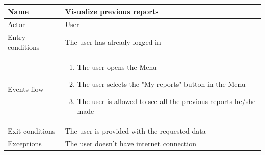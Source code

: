 \documentclass{article}
\begin{document}
\begin{table}[H]
    \begin{tabular}{|l|l|}
    \hline
    Name & \begin{minipage}[t]{0.7\textwidth} \textbf{Visualize previous reports}\end{minipage} \\ \hline  
    Actor & \begin{minipage}[t]{0.7\textwidth} User\end{minipage} \\ \hline 
    Entry conditions & \begin{minipage}[t]{0.7\textwidth} The user has already
    logged in \end{minipage} \\
    \hline 
    Events flow & \begin{minipage}[t]{0.7\textwidth} 
    \begin{enumerate}
        \item The user opens the Menu
        \item The user selects the "My reports" button in the Menu
        \item The user is allowed to see all the previous reports he/she made
    \end{enumerate}    
    \end{minipage} \\ \hline
    Exit conditions & \begin{minipage}[t]{0.7\textwidth} The user is provided
    with the requested data \end{minipage} \\
    \hline
    Exceptions & \begin{minipage}[t]{0.7\textwidth} The user doesn't have
    internet connection  \end{minipage} \\ \hline
    \end{tabular}
\end{table}
\end{document}
